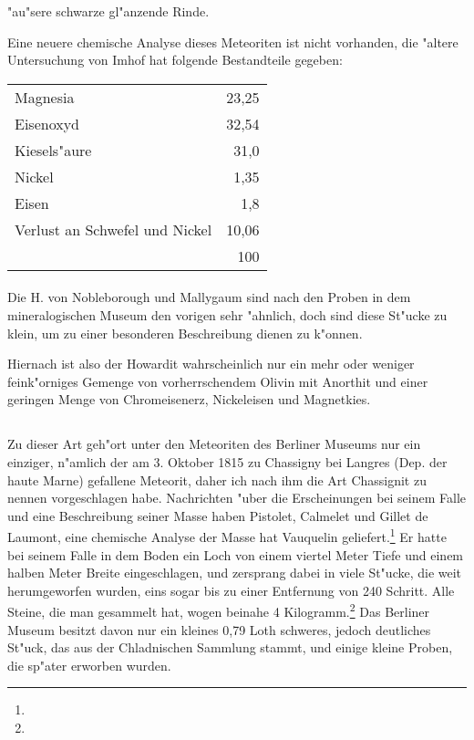 \documentclass[a4paper, 11pt, oneside]{article}
\begin{document}
"au"sere schwarze gl"anzende Rinde.

Eine neuere chemische Analyse dieses Meteoriten ist nicht vorhanden, die "altere Untersuchung von Imhof hat folgende Bestandteile gegeben:
\begin{center}
\begin{tabular}{ l r }
    Magnesia & 23,25\\
    Eisenoxyd & 32,54\\
    Kiesels"aure & 31,0\\
    Nickel & 1,35\\
    Eisen & 1,8\\
    Verlust an Schwefel und Nickel & 10,06\\
     & 100\\  
\end{tabular}
\end{center}
\paragraph{}
Die H. von Nobleborough und Mallygaum sind nach den Proben in dem mineralogischen Museum den vorigen sehr "ahnlich, doch sind diese St"ucke zu klein, um zu einer besonderen Beschreibung dienen zu k"onnen.

Hiernach ist also der Howardit wahrscheinlich nur ein mehr oder weniger feink"orniges Gemenge von vorherrschendem Olivin mit Anorthit und einer geringen Menge von Chromeisenerz, Nickeleisen und Magnetkies.
\subsection{}
\paragraph{}
Zu dieser Art geh"ort unter den Meteoriten des Berliner Museums nur ein einziger, n"amlich der am 3. Oktober 1815 zu Chassigny bei Langres (Dep. der haute Marne) gefallene Meteorit, daher ich nach ihm die Art Chassignit zu nennen vorgeschlagen habe. Nachrichten "uber die Erscheinungen bei seinem Falle und eine Beschreibung seiner Masse haben Pistolet, Calmelet und Gillet de Laumont, eine chemische Analyse der Masse hat Vauquelin geliefert.\footnote{} Er hatte bei seinem Falle in dem Boden ein Loch von einem viertel Meter Tiefe und einem halben Meter Breite eingeschlagen, und zersprang dabei in viele St"ucke, die weit herumgeworfen wurden, eins sogar bis zu einer Entfernung von 240 Schritt. Alle Steine, die man gesammelt hat, wogen beinahe 4 Kilogramm.\footnote{} Das Berliner Museum besitzt davon nur ein kleines 0,79 Loth schweres, jedoch deutliches St"uck, das aus der Chladnischen Sammlung stammt, und einige kleine Proben, die sp"ater erworben wurden.
\end{document}
